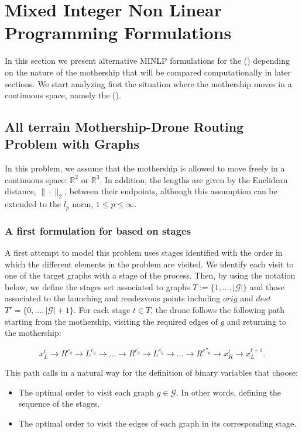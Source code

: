 \section{Mixed Integer Non Linear Programming Formulations}\label{Form}
\noindent
In this section we present alternative MINLP formulations for the (\MDR) depending on the nature of  the mothership  that will be compared computationally in later sections. We start analyzing first the situation where the mothership moves in a continuous space, namely the (\AMD).

 \subsection{All terrain Mothership-Drone Routing Problem with Graphs}
 \noindent
 In this problem, we assume that the mothership  is allowed to move freely in a continuous space: $\mathbb R^2$ or $\mathbb R^3$. In addition, the lengths are given by the Euclidean distance, $\|\cdot\|_2$, between their endpoints, although this assumption can be extended to the $l_p$ norm, $1\leq p\leq \infty$.
 
\subsubsection{A first formulation for \AMD\xspace based on stages}
\noindent
A first attempt to model this problem uses stages identified with the order in which the different elements in the problem are visited. We identify each visit to one of the target graphs with a stage of the process. Then, by using the notation below, we define the stages set associated to graphs $T:=\{1,\ldots,|\mathcal G|\}$ and those associated to the launching and rendezvous points including $orig$ and $dest$ $T'=\{0,\ldots,|\mathcal G|+1\}$. For each stage $t\in T$, the drone follows the following path starting from the mothership, visiting the required edges of $g$ and returning to the mothership:

$$
x_L^t\rightarrow R^{e_g}\rightarrow L^{e_g}\rightarrow\ldots\rightarrow R^{e^\prime_g}\rightarrow L^{e^\prime_g}\rightarrow \ldots \rightarrow R^{e''_g} \rightarrow x_R^t\rightarrow x_L^{t+1}.
$$

This path calls in a natural way for the definition of binary variables that choose:
\begin{itemize}
    \item The optimal order to visit each graph $g\in\mathcal G$. In other words, defining the sequence of the stages.
    \item The optimal order to visit the edges of each graph in its corresponding stage.
\end{itemize}

